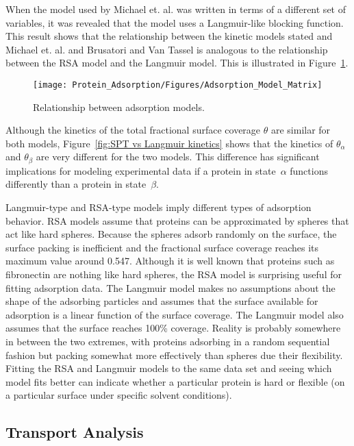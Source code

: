 When the model used by Michael et. al. \cite{Michael2003} was written
in terms of a different set of variables, it was revealed that the
model uses a Langmuir-like blocking function. This result shows that
the relationship between the kinetic models stated and Michael et.
al. and Brusatori and Van Tassel is analogous to the relationship
between the RSA model and the Langmuir model. This is illustrated
in Figure~\ref{fig:Adsorption Model Matrix}.%
\begin{figure}
\texttt{[image: Protein\_Adsorption/Figures/Adsorption\_Model\_Matrix]}

\caption{\label{fig:Adsorption Model Matrix}Relationship between adsorption
models.}


%
\end{figure}
 Although the kinetics of the total fractional surface coverage $\theta$
are similar for both models, Figure~\ref{fig:SPT vs Langmuir kinetics}
shows that the kinetics of $\theta_{\alpha}$ and $\theta_{\beta}$
are very different for the two models. This difference has significant
implications for modeling experimental data if a protein in state~$\alpha$
functions differently than a protein in state~$\beta$.

Langmuir-type and RSA-type models imply different types of adsorption
behavior. RSA models assume that proteins can be approximated by spheres
that act like hard spheres. Because the spheres adsorb randomly on
the surface, the surface packing is inefficient and the fractional
surface coverage reaches its maximum value around 0.547. Although
it is well known that proteins such as fibronectin are nothing like
hard spheres, the RSA model is surprising useful for fitting adsorption
data. The Langmuir model makes no assumptions about the shape of the
adsorbing particles and assumes that the surface available for adsorption
is a linear function of the surface coverage. The Langmuir model also
assumes that the surface reaches 100\% coverage. Reality is probably
somewhere in between the two extremes, with proteins adsorbing in
a random sequential fashion but packing somewhat more effectively
than spheres due their flexibility. Fitting the RSA and Langmuir models
to the same data set and seeing which model fits better can indicate
whether a particular protein is hard or flexible (on a particular
surface under specific solvent conditions).


\subsection{Transport Analysis}

